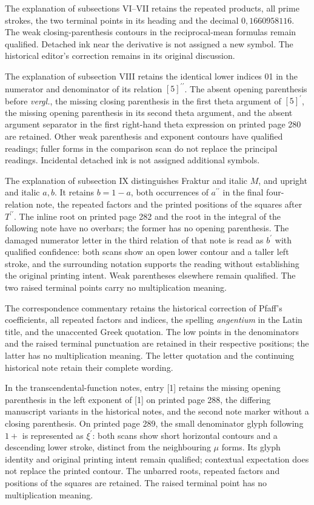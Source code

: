 The explanation of subsections VI–VII retains the repeated products, all prime strokes, the two terminal points in its heading and the decimal $0{,}1660958116$. The weak closing-parenthesis contours in the reciprocal-mean formulas remain qualified. Detached ink near the derivative is not assigned a new symbol. The historical editor’s correction remains in its original discussion.

The explanation of subsection VIII retains the identical lower indices 01 in the numerator and denominator of its relation $[5]^{\prime\prime}$. The absent opening parenthesis before \textit{vergl.}, the missing closing parenthesis in the first theta argument of $[5]^{\prime}$, the missing opening parenthesis in its second theta argument, and the absent argument separator in the first right-hand theta expression on printed page 280 are retained. Other weak parenthesis and exponent contours have qualified readings; fuller forms in the comparison scan do not replace the principal readings. Incidental detached ink is not assigned additional symbols.

The explanation of subsection IX distinguishes Fraktur and italic $M$, and upright and italic $a,b$. It retains $b=1-a$, both occurrences of $a^{\prime\prime}$ in the final four-relation note, the repeated factors and the printed positions of the squares after $T^{\prime\prime}$. The inline root on printed page 282 and the root in the integral of the following note have no overbars; the former has no opening parenthesis. The damaged numerator letter in the third relation of that note is read as $b^{\prime}$ with qualified confidence: both scans show an open lower contour and a taller left stroke, and the surrounding notation supports the reading without establishing the original printing intent. Weak parentheses elsewhere remain qualified. The two raised terminal points carry no multiplication meaning.

The correspondence commentary retains the historical correction of Pfaff’s coefficients, all repeated factors and indices, the spelling \textit{angentium} in the Latin title, and the unaccented Greek quotation. The low points in the denominators and the raised terminal punctuation are retained in their respective positions; the latter has no multiplication meaning. The letter quotation and the continuing historical note retain their complete wording.

In the transcendental-function notes, entry [1] retains the missing opening parenthesis in the left exponent of [1] on printed page 288, the differing manuscript variants in the historical notes, and the second note marker without a closing parenthesis. On printed page 289, the small denominator glyph following $1+$ is represented as $\xi^{\prime}$: both scans show short horizontal contours and a descending lower stroke, distinct from the neighbouring $\mu$ forms. Its glyph identity and original printing intent remain qualified; contextual expectation does not replace the printed contour. The unbarred roots, repeated factors and positions of the squares are retained. The raised terminal point has no multiplication meaning.


